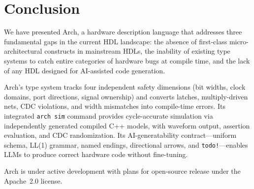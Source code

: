 \documentclass[11pt,twocolumn]{article}
\begin{document}
\section{Conclusion}\label{sec:conclusion}

We have presented Arch, a hardware description language that addresses three fundamental gaps in the current HDL landscape: the absence of first-class micro-architectural constructs in mainstream HDLs, the inability of existing type systems to catch entire categories of hardware bugs at compile time, and the lack of any HDL designed for AI-assisted code generation.

Arch's type system tracks four independent safety dimensions (bit widths, clock domains, port directions, signal ownership) and converts latches, multiply-driven nets, CDC violations, and width mismatches into compile-time errors.
Its integrated \texttt{arch sim} command provides cycle-accurate simulation via independently generated compiled C++ models, with waveform output, assertion evaluation, and CDC randomization.
Its AI-generatability contract---uniform schema, LL(1) grammar, named endings, directional arrows, and \texttt{todo!}---enables LLMs to produce correct hardware code without fine-tuning.

Arch is under active development with plans for open-source release under the Apache~2.0 license.


\end{document}
